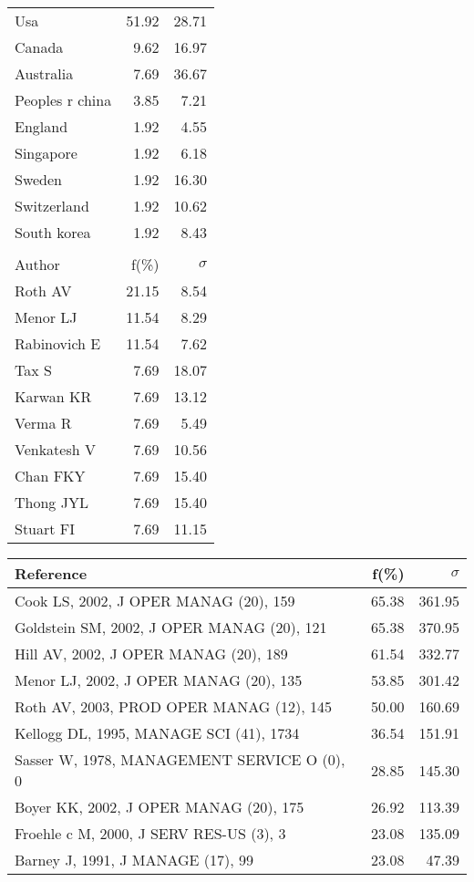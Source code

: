 \documentclass[a4paper,11pt]{report}
\begin{document}
\begin{landscape}
\begin{table}[!ht]
{\begin{tabular}{|l r r|}
Usa & 51.92 & 28.71\\
Canada & 9.62 & 16.97\\
Australia & 7.69 & 36.67\\
Peoples r china & 3.85 & 7.21\\
England & 1.92 & 4.55\\
Singapore & 1.92 & 6.18\\
Sweden & 1.92 & 16.30\\
Switzerland & 1.92 & 10.62\\
South korea & 1.92 & 8.43\\
 &  & \\
\hline
\hline
Author & f(\%) & $\sigma$\\
\hline
Roth AV & 21.15 & 8.54\\
Menor LJ & 11.54 & 8.29\\
Rabinovich E & 11.54 & 7.62\\
Tax S & 7.69 & 18.07\\
Karwan KR & 7.69 & 13.12\\
Verma R & 7.69 & 5.49\\
Venkatesh V & 7.69 & 10.56\\
Chan FKY & 7.69 & 15.40\\
Thong JYL & 7.69 & 15.40\\
Stuart FI & 7.69 & 11.15\\
\hline
\end{tabular}
}
{\scriptsize\begin{tabular}{|l r r|}
\hline
Reference & f(\%) & $\sigma$\\
\hline
Cook LS, 2002, J OPER MANAG (20), 159 & 65.38 & 361.95\\
Goldstein SM, 2002, J OPER MANAG (20), 121 & 65.38 & 370.95\\
Hill AV, 2002, J OPER MANAG (20), 189 & 61.54 & 332.77\\
Menor LJ, 2002, J OPER MANAG (20), 135 & 53.85 & 301.42\\
Roth AV, 2003, PROD OPER MANAG (12), 145 & 50.00 & 160.69\\
Kellogg DL, 1995, MANAGE SCI (41), 1734 & 36.54 & 151.91\\
Sasser W, 1978, MANAGEMENT SERVICE O (0), 0 & 28.85 & 145.30\\
Boyer KK, 2002, J OPER MANAG (20), 175 & 26.92 & 113.39\\
Froehle c M, 2000, J SERV RES-US (3), 3 & 23.08 & 135.09\\
Barney J, 1991, J MANAGE (17), 99 & 23.08 & 47.39\\

\end{tabular}}
\end{table}
\end{landscape}
\end{document}
